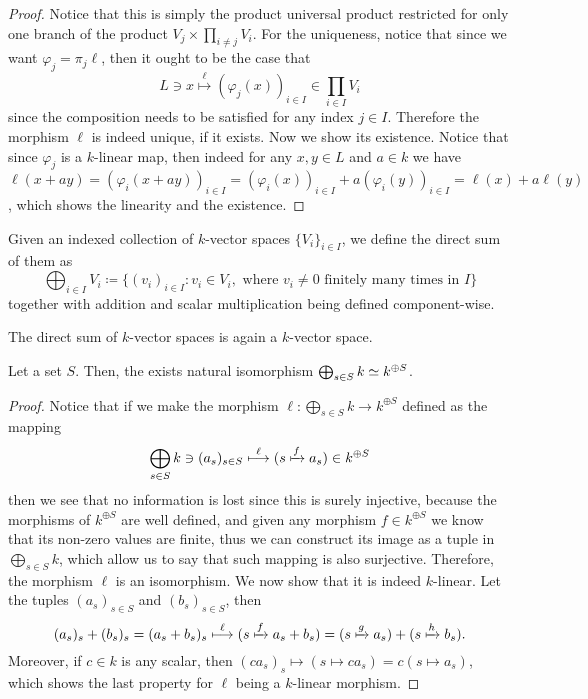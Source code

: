 \begin{proof}
Notice that this is simply the product universal product restricted for only
one branch of the product \(V_j \times \prod_{i \neq j} V_i\). For the
uniqueness, notice that since we want \(\varphi_j = \pi_j  \ell\), then
it ought to be the case that
\[
  L \ni x \overset{\ell}\longmapsto (\varphi_j(x))_{i \in I} \in \prod_{i
  \in I} V_i
\]
since the composition needs to be satisfied for any index \(j \in I\).
Therefore the morphism \(\ell\) is indeed unique, if it exists. Now we show
its existence. Notice that since \(\varphi_j\) is a \(k\)-linear map, then
indeed for any \(x, y \in L\) and \(a \in k\) we have \(\ell(x + ay) =
(\varphi_i(x + ay))_{i \in I} = (\varphi_i(x))_{i \in I} + a
(\varphi_i(y))_{i \in I} = \ell(x) + a \ell(y)\), which shows the linearity
and the existence.
\end{proof}

\begin{definition}
Given an indexed collection of \(k\)-vector spaces \(\{V_i\}_{i \in I}\), we
define the direct sum of them as
\[
  \bigoplus _{i \in I} V_i \coloneq \{(v_i)_{i \in I} \colon v_i \in V_i, \text{ where
  } v_i \neq 0 \text{ finitely many times in } I\}
\]
together with addition and scalar multiplication being defined component-wise.
\end{definition}

\begin{proposition}
The direct sum of \(k\)-vector spaces is again a \(k\)-vector space.
\end{proposition}

\begin{proposition}
Let a set \(S\). Then, the exists natural isomorphism \(\bigoplus_{s \in S} k
\simeq k^{\oplus S}\).
\end{proposition}

\begin{proof}
Notice that if we make the morphism \(\ell : \bigoplus_{s \in S} k \to
k^{\oplus S}\) defined as the mapping
\[
  \bigoplus_{s \in S} k \ni (a_s)_{s \in S} \overset{\ell}\longmapsto (s
  \xmapsto{f} a_s) \in k^{\oplus S}
\]
then we see that no information is lost since this is surely injective,
because the morphisms of \(k^{\oplus S}\) are well defined, and given any
morphism \(f \in k^{\oplus S}\) we know that its non-zero values are finite,
thus we can construct its image as a tuple in \(\bigoplus_{s \in S} k\),
which allow us to say that such mapping is also surjective. Therefore, the
morphism \(\ell\) is an isomorphism. We now show that it is indeed
\(k\)-linear. Let the tuples \((a_s)_{s \in S}\) and \((b_s)_{s \in S}\),
then
\[
  (a_s)_s + (b_s)_s = (a_s + b_s)_s \overset \ell \longmapsto (s \xmapsto f
  a_s + b_s) = (s \xmapsto g a_s) + (s \xmapsto h b_s).
\]
Moreover, if \(c \in k\) is any scalar, then \((c a_s)_s \longmapsto (s
\mapsto c a_s) = c (s \mapsto a_s)\), which shows the last property for
\(\ell\) being a \(k\)-linear morphism.
\end{proof}

